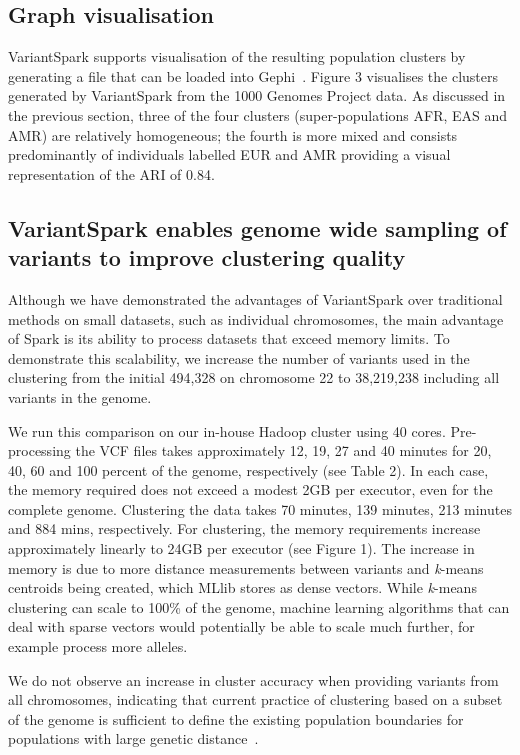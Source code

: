 \documentclass{bmcart}
\newcommand{\variantSpark}{{\sc VariantSpark}}
\newcommand{\kMeans}{\textit{k}-means}
\begin{document}
\subsection*{Graph visualisation}
\variantSpark{} supports visualisation of the resulting population clusters by generating a file that can be loaded into {\sc Gephi}~\cite{ICWSM09154}.
Figure 3 visualises the clusters generated by \variantSpark{} from the 1000 Genomes Project data. 
As discussed in the previous section, three of the four clusters (super-populations AFR, EAS and AMR) are relatively homogeneous; the fourth is more mixed and 
consists predominantly of individuals labelled EUR and AMR providing a visual representation of the ARI of 0.84.


\subsection*{\variantSpark{} enables genome wide sampling of variants to improve clustering quality}
Although we have demonstrated the advantages of \variantSpark{} over traditional methods on small datasets, such as individual chromosomes, the main advantage of {\sc Spark} is its ability to process datasets that exceed memory limits.
To demonstrate this scalability, we increase the number of variants used in the clustering from the initial 494,328 on chromosome 22 to 38,219,238 including all variants in the genome.

We run this comparison on our in-house Hadoop cluster using 40 cores.
Pre-processing the VCF files takes approximately 12, 19, 27 and 40 minutes for 20, 40, 60 and 100 percent of the genome, respectively (see Table 2).
In each case, the memory required does not exceed a modest 2GB per executor, even for the complete genome. 
Clustering the data takes 70 minutes, 139 minutes, 213 minutes and 884 mins, respectively.
For clustering, the memory requirements increase approximately linearly to 24GB per executor (see Figure 1). 
The increase in memory is due to more distance measurements between variants and \kMeans{} centroids being created, which MLlib stores as dense vectors. 
While \kMeans{} clustering can scale to 100\% of the genome, machine learning algorithms that can deal with sparse vectors would potentially be able to scale much further, for example process more alleles.

We do not observe an increase in cluster accuracy when providing variants from all chromosomes, indicating that current practice of clustering based on a subset of the genome is sufficient to define the existing population boundaries for populations with large genetic distance~\cite{Pugach2015}.
\end{document}
